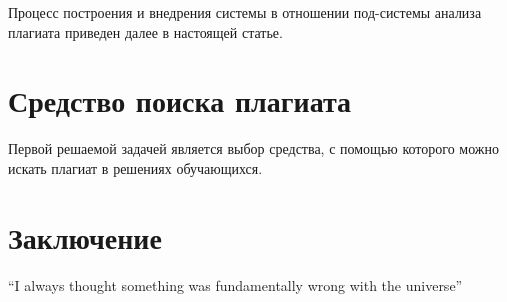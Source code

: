 \documentclass{article}
\begin{document}
Процесс построения и внедрения системы в отношении под-системы анализа плагиата приведен далее в настоящей статье.

\section{Средство поиска плагиата}

Первой решаемой задачей является выбор средства, с помощью которого можно искать плагиат в решениях обучающихся.

\section{Заключение}
``I always thought something was fundamentally wrong with the universe'' \citep{adams1995hitchhiker}



\end{document}
